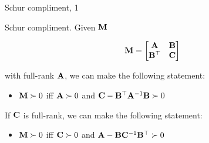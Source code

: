 \documentclass{beamer}
\begin{document}
\begin{frame}{Schur compliment, 1}
	\begin{flushleft}
		
		Schur compliment. Given $\mathbf{M}$
		
		\begin{equation}
			\mathbf{M} = 
			\begin{bmatrix}
				\mathbf{A} & \mathbf{B} \\
				\mathbf{B}^\top & \mathbf{C}
			\end{bmatrix}
		\end{equation}
		
		with full-rank $\mathbf{A}$, we can make the following statement:
		
		\begin{itemize}
			\item $\mathbf{M} \succ 0$ iff $\mathbf{A} \succ 0$ and $\mathbf{C} - \mathbf{B}^\top\mathbf{A}^{-1}\mathbf{B} \succ 0$
		\end{itemize}
		
		\bigskip
		
		If $\mathbf{C}$ is full-rank, we can make the following statement:
		
		\begin{itemize}
			\item $\mathbf{M} \succ 0$ iff $\mathbf{C} \succ 0$ and $\mathbf{A} - \mathbf{B}\mathbf{C}^{-1}\mathbf{B}^\top \succ 0$
		\end{itemize}		
		
		
		
	\end{flushleft}
\end{frame}
\end{document}
